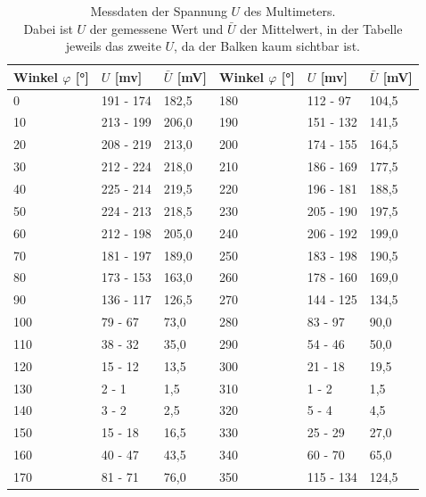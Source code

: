 \documentclass[12pt,a4paper,twoside]{article}
\begin{document}
\begin{table}[H]
    \centering
    \caption{Messdaten der Spannung $U$ des Multimeters.
    \\
    Dabei ist $U$ der gemessene Wert und $\bar{U}$ der Mittelwert, in der Tabelle jeweils das zweite $U$, da der Balken kaum sichtbar ist. }
    \label{tab:Messdaten Mallus}
    \begin{tabular}{| l | l | l | l | l | l |}
        \hline
        Winkel $\varphi$ [°] & $U$ [mv] & $\bar{U}$ [mV] & Winkel $\varphi$ [°] & $U$ [mv] & $\bar{U}$ [mV] \\
        \hline
        0    & 191 - 174 & 182,5  & 180   & 112 - 97  &104,5 \\
        10   & 213 - 199 & 206,0  & 190   & 151 - 132 &141,5 \\
        20   & 208 - 219 & 213,0  & 200   & 174 - 155 &164,5 \\
        30   & 212 - 224 & 218,0  & 210   & 186 - 169 &177,5 \\
        40   & 225 - 214 & 219,5  & 220   & 196 - 181 &188,5 \\
        50   & 224 - 213 & 218,5  & 230   & 205 - 190 &197,5 \\
        60   & 212 - 198 & 205,0  & 240   & 206 - 192 &199,0 \\
        70   & 181 - 197 & 189,0  & 250   & 183 - 198 &190,5 \\
        80   & 173 - 153 & 163,0  & 260   & 178 - 160 &169,0 \\
        90   & 136 - 117 & 126,5  & 270   & 144 - 125 &134,5 \\
        100  & 79 - 67   &  73,0  & 280   & 83 - 97   & 90,0  \\
        110  & 38 - 32   &  35,0  & 290   & 54 - 46   & 50,0  \\
        120  & 15 - 12   &  13,5  & 300   & 21 - 18   & 19,5  \\
        130  & 2 - 1     &   1,5  & 310   & 1 - 2     &  1,5   \\
        140  & 3 - 2     &   2,5  & 320   & 5 - 4     &  4,5   \\
        150  & 15 - 18   &  16,5  & 330   & 25 - 29   & 27,0  \\
        160  & 40 - 47   &  43,5  & 340   & 60 - 70   & 65,0  \\
        170  & 81 - 71   &  76,0  & 350   & 115 - 134 &124,5 \\
        \hline
    \end{tabular}
\end{table}
\end{document}
